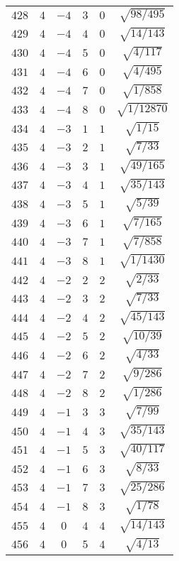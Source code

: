 \begin{table}
\begin{center}
\begin{tabular}{|c|c|c|c|c|c|}
$428$ & $4$ & $-4$ & $3$ & $0$ & $\sqrt{98/495}$ \\ 
$429$ & $4$ & $-4$ & $4$ & $0$ & $\sqrt{14/143}$ \\ 
$430$ & $4$ & $-4$ & $5$ & $0$ & $\sqrt{4/117}$ \\ 
$431$ & $4$ & $-4$ & $6$ & $0$ & $\sqrt{4/495}$ \\ 
$432$ & $4$ & $-4$ & $7$ & $0$ & $\sqrt{1/858}$ \\ 
$433$ & $4$ & $-4$ & $8$ & $0$ & $\sqrt{1/12870}$ \\ 
$434$ & $4$ & $-3$ & $1$ & $1$ & $\sqrt{1/15}$ \\ 
$435$ & $4$ & $-3$ & $2$ & $1$ & $\sqrt{7/33}$ \\ 
$436$ & $4$ & $-3$ & $3$ & $1$ & $\sqrt{49/165}$ \\ 
$437$ & $4$ & $-3$ & $4$ & $1$ & $\sqrt{35/143}$ \\ 
$438$ & $4$ & $-3$ & $5$ & $1$ & $\sqrt{5/39}$ \\ 
$439$ & $4$ & $-3$ & $6$ & $1$ & $\sqrt{7/165}$ \\ 
$440$ & $4$ & $-3$ & $7$ & $1$ & $\sqrt{7/858}$ \\ 
$441$ & $4$ & $-3$ & $8$ & $1$ & $\sqrt{1/1430}$ \\ 
$442$ & $4$ & $-2$ & $2$ & $2$ & $\sqrt{2/33}$ \\ 
$443$ & $4$ & $-2$ & $3$ & $2$ & $\sqrt{7/33}$ \\ 
$444$ & $4$ & $-2$ & $4$ & $2$ & $\sqrt{45/143}$ \\ 
$445$ & $4$ & $-2$ & $5$ & $2$ & $\sqrt{10/39}$ \\ 
$446$ & $4$ & $-2$ & $6$ & $2$ & $\sqrt{4/33}$ \\ 
$447$ & $4$ & $-2$ & $7$ & $2$ & $\sqrt{9/286}$ \\ 
$448$ & $4$ & $-2$ & $8$ & $2$ & $\sqrt{1/286}$ \\ 
$449$ & $4$ & $-1$ & $3$ & $3$ & $\sqrt{7/99}$ \\ 
$450$ & $4$ & $-1$ & $4$ & $3$ & $\sqrt{35/143}$ \\ 
$451$ & $4$ & $-1$ & $5$ & $3$ & $\sqrt{40/117}$ \\ 
$452$ & $4$ & $-1$ & $6$ & $3$ & $\sqrt{8/33}$ \\ 
$453$ & $4$ & $-1$ & $7$ & $3$ & $\sqrt{25/286}$ \\ 
$454$ & $4$ & $-1$ & $8$ & $3$ & $\sqrt{1/78}$ \\ 
$455$ & $4$ & $0$ & $4$ & $4$ & $\sqrt{14/143}$ \\ 
$456$ & $4$ & $0$ & $5$ & $4$ & $\sqrt{4/13}$ \\ 

\end{tabular}
\end{center}
\end{table}
